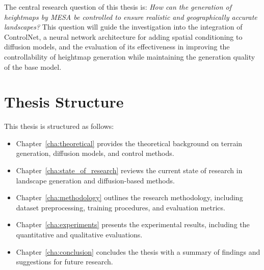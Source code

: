 The central research question of this thesis is:
\textit{How can the generation of heightmaps by MESA be controlled to ensure realistic and geographically accurate landscapes?}
This question will guide the investigation into the integration of ControlNet, a neural network architecture for adding spatial conditioning to diffusion models, and the evaluation of its effectiveness in improving the controllability of heightmap generation while maintaining the generation quality of the base model.

\section{Thesis Structure}
\label{sec:thesisstructure}

This thesis is structured as follows:
\begin{itemize}
	\item Chapter~\ref{cha:theoretical} provides the theoretical background on terrain generation, diffusion models, and control methods.
	\item Chapter~\ref{cha:state_of_research} reviews the current state of research in landscape generation and diffusion-based methods.
	\item Chapter~\ref{cha:methodology} outlines the research methodology, including dataset preprocessing, training procedures, and evaluation metrics.
	\item Chapter~\ref{cha:experiments} presents the experimental results, including the quantitative and qualitative evaluations.
	\item Chapter~\ref{cha:conclusion} concludes the thesis with a summary of findings and suggestions for future research.
\end{itemize}
